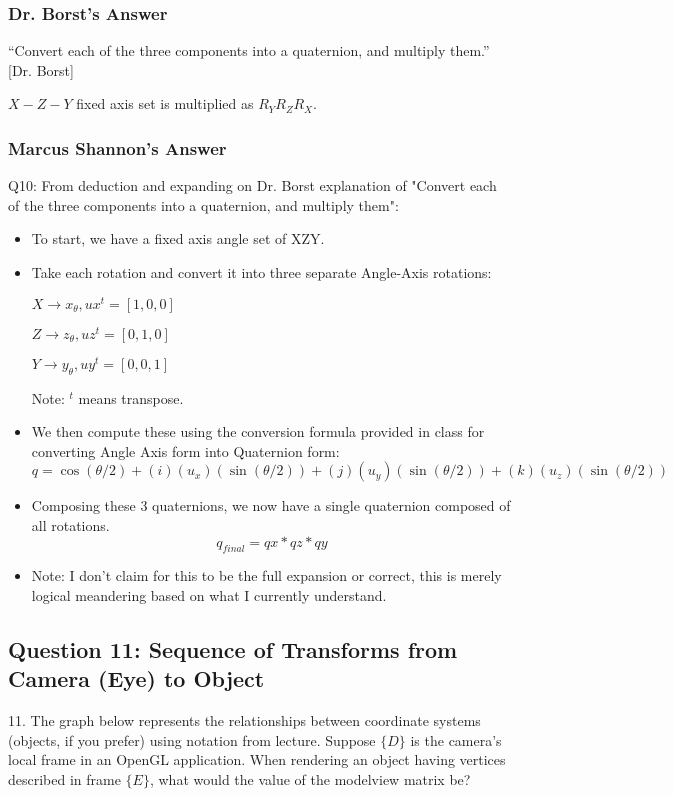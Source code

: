 \documentclass[11pt]{article}
\begin{document}
\begin{spacing}{1.2}
\subsubsection{Dr. Borst's Answer}

``Convert each of the three components into a quaternion, and multiply them.'' [Dr. Borst]

$X-Z-Y$ fixed axis set is multiplied as $R_YR_ZR_X$.

\subsubsection{Marcus Shannon's Answer}
Q10: From deduction and expanding on Dr. Borst explanation of  "Convert each of the three components into a quaternion, and multiply them":

\begin{itemize}
    \item To start, we have a fixed axis angle set of XZY.
    \item Take each rotation and convert it into three separate Angle-Axis rotations:
    
        $ X \to x_\theta, ux^t = [1, 0, 0]$
        
        $Z \to z_\theta, uz^t = [0, 1, 0]$
        
        $Y \to y_\theta, uy^t = [0, 0, 1]$
        
        Note: $^t$ means transpose.
    	\item We then compute these using the conversion formula provided in class for converting Angle Axis form into Quaternion form:
        $$q = \cos(\theta/2) + (i)(u_x)(\sin(\theta/2)) + (j)(u_y)(\sin(\theta/2)) + (k)(u_z)(\sin(\theta/2))$$
    \item Composing these 3 quaternions, we now have a single quaternion composed of all rotations.
        $$q_{final} = qx * qz * qy$$
    \item Note: I don't claim for this to be the full expansion or correct, this is merely logical meandering based on what I currently understand.
    \end{itemize}
    
\subsection{Question 11:  Sequence of Transforms from Camera (Eye) to Object}
11.  The graph below represents the relationships between coordinate systems (objects, if you prefer) using notation from lecture.  Suppose $\{D\}$ is the camera's local frame in an OpenGL application.  When rendering an object having vertices described in frame $\{E\}$, what would the value of the modelview matrix be?


\end{spacing}
\end{document}
